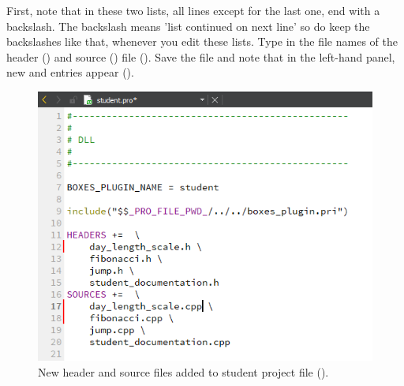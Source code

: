 First, note that in these two lists, all lines except for the last one, end with a backslash. The backslash means 'list continued on next line' so do keep the backslashes like that, whenever you edit these lists. Type in the file names of the  header () and source () file (). Save the file and note that in the left-hand panel, new  and  entries appear ().

\begin{figure}
\centering
\includegraphics[scale=0.7]{graphics/qt-creator-project-file-2}
\caption{New header and source files added to student project file ().}
\label{fig:qt-creator-project-file-2}
\end{figure}

